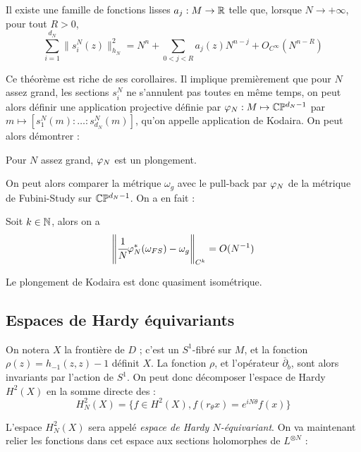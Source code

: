 \begin{theorem}[Zelditch] Il existe une famille de fonctions lisses $a_j : M \to \mathbb{R}$ telle que, lorsque $N \to +\infty$, pour tout $R>0$,  
	\begin{equation*}
	\sum_{i=1}^{d_N}\|s^N_i(z)\|^2_{h_N} = N^n + \sum_{0 < j < R} a_j(z)N^{n-j} + O_{C^{\infty}}(N^{n-R})
	\end{equation*}
\end{theorem}

Ce théorème est riche de ses corollaires. Il implique premièrement que pour $N$ assez grand, les sections $s^N_i$ ne s'annulent pas toutes en même temps, on peut alors définir une application projective définie par $\varphi_N : M \mapsto \mathbb{C}\mathbb{P}^{d_N-1}$ par $m \mapsto [s^N_1(m) : \ldots : s^N_{d_N}(m)]$, qu'on appelle application de Kodaira. On peut alors démontrer :
\begin{theorem}[Kodaira] \cite{fritzsche} Pour $N$ assez grand, $\varphi_N$ est un plongement. \end{theorem}

On peut alors comparer la métrique $\omega_g$ avec le pull-back par $\varphi_N$ de la métrique de Fubini-Study sur $\mathbb{C}\mathbb{P}^{d_N-1}$. On a en fait :

\begin{theorem}[Tian] \cite{tian1990set} Soit $k \in \mathbb{N}$, alors on a \begin{equation*}
\left\|\cfrac1N \varphi_N^*(\omega_{FS}) - \omega_g \right\|_{C^{k}} = O(N^{-1})
\end{equation*}\end{theorem}

Le plongement de Kodaira est donc quasiment isométrique.

\subsection{Espaces de Hardy équivariants}

On notera $X$ la frontière de $D$ ; c'est un $S^1$-fibré sur $M$, et la fonction $\rho(z)=h_{-1}(z,z)-1$ définit $X$. La fonction $\rho$, et l'opérateur $\overline{\partial}_b$, sont alors invariants par l'action de $S^1$. On peut donc décomposer l'espace de Hardy $H^2(X)$ en la somme directe des :
\begin{equation*}
	H^2_N(X)=\{f \in H^2(X), f(r_{\theta}x) = e^{iN\theta}f(x)\}
\end{equation*}

L'espace $H^2_N(X)$ sera appelé \emph{espace de Hardy $N$-équivariant}. On va maintenant relier les fonctions dans cet espace aux sections holomor\-phes de $L^{\otimes N}$ :

